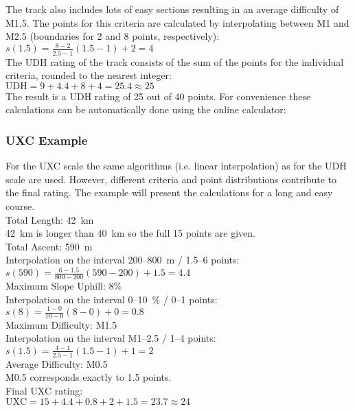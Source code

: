 \documentclass[a4paper,oneside]{scrartcl}
\begin{document}
The track also includes lots of easy sections resulting in an average difficulty
of M1.5. The points for this criteria are calculated by interpolating between M1 and M2.5
(boundaries for 2 and 8 points, respectively): 
$s(1.5) = \frac{8 - 2}{2.5 - 1} (1.5 - 1) + 2 = 4$\\

The UDH rating of the track consists of the sum of the points for the individual criteria, 
rounded to the nearest integer:\\
$\mathrm{UDH} = 9 + 4.4 + 8 + 4 = 25.4 \approx 25$\\
The result is a UDH rating of 25 out of 40 points. For convenience these calculations 
can be automatically done using the online calculator: %

\subsubsection{UXC Example}
For the UXC scale the same algorithms (i.e. linear interpolation) as for the UDH scale are used. However, different criteria and point distributions contribute
to the final rating. The example will present the calculations for a long and easy course.\\

{\parindent0pt
Total Length: 42~km\\
42~km is longer than 40~km so the full 15 points are given. \\

Total Ascent: 590~m\\
Interpolation on the interval 200--800~m / 1.5--6 points:\\
$s(590) = \frac{6 - 1.5}{800 - 200} (590 - 200) + 1.5 = 4.4$\\

Maximum Slope Uphill:  8\% \\
Interpolation on the interval 0--10~\% / 0--1 points:\\
$s(8) = \frac{1 - 0}{10 - 0} (8 - 0) + 0 = 0.8$\\

Maximum Difficulty: M1.5\\
Interpolation on the interval M1--2.5 / 1--4 points:\\
$s(1.5) = \frac{4 - 1}{2.5 - 1} (1.5 - 1) + 1 = 2$\\

Average Difficulty: M0.5\\
M0.5 corresponds exactly to 1.5 points.\\

Final UXC rating:\\
$\mathrm{UXC} = 15 + 4.4 + 0.8 + 2 + 1.5 = 23.7 \approx 24$\\
}
\end{document}
